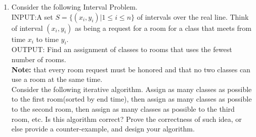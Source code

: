 \documentclass{article}
\newtheorem*{solution}{Solution}
\begin{document}
\begin{enumerate}
\begin{solution}
\begin{minipage}[t]{0.8\textwidth}
\begin{algorithm}[H]
            \BlankLine
            \caption{Greedy-low-buy-high-sell}\label{Alg-greedy3}
            $profit \leftarrow 0$\\
        \end{algorithm}
    \end{minipage}\\
    $T(n)=O(n)$
\end{solution}
~\\

\item Consider the following Interval Problem. \\
INPUT:A set $S = \{(x_i, y_i)|1 \leq  i \leq  n\}$ of intervals over the real line. Think of interval $(x_i
, y_i)$ as being a request for a room for a class that meets from time $x_i$ to time $y_i$.\\
OUTPUT: Find an assignment of classes to rooms that uses the fewest number of rooms.\\
\textbf{Note:} that every room request must be honored and that no two classes can use a room at the same
time.\\

Consider the following iterative algorithm. Assign as many classes as possible to the first room(sorted by end time), then assign as many classes as possible to the second room, then assign as many classes as possible to the third room, etc. Is this algorithm correct? Prove the correctness of such idea, or else provide a counter-example, and design your algorithm.\\
   


\end{enumerate}
\end{document}

